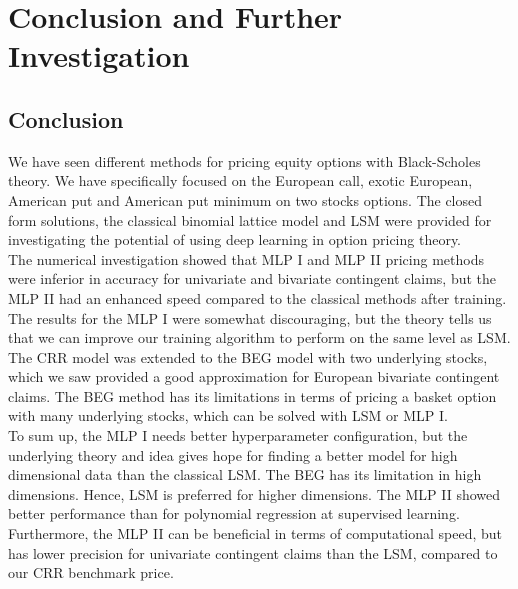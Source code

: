
\chapter{Conclusion and Further Investigation} %

\label{Chapter7} %


\section{Conclusion}
We have seen different methods for pricing equity options with Black-Scholes theory. We have specifically focused on the European call, exotic European, American put and American put minimum on two stocks options. The closed form solutions, the classical binomial lattice model and LSM were provided for investigating the potential of using deep learning in option pricing theory. \\

The numerical investigation showed that MLP I and MLP II pricing methods were inferior in accuracy for univariate and bivariate contingent claims, but the MLP II had an enhanced speed compared to the classical methods after training. The results for the MLP I were somewhat discouraging, but the theory tells us that we can improve our training algorithm to perform on the same level as LSM. The CRR model was extended to the BEG model with two underlying stocks, which we saw provided a good approximation for European bivariate contingent claims. The BEG method has its limitations in terms of pricing a basket option with many underlying stocks, which can be solved with LSM or MLP I.\\

To sum up, the MLP I needs better hyperparameter configuration, but the underlying theory and idea gives hope for finding a better model for high dimensional data than the classical LSM. The BEG has its limitation in high dimensions. Hence, LSM is preferred for higher dimensions. The MLP II showed better performance than for polynomial regression at supervised learning. Furthermore, the MLP II can be beneficial in terms of computational speed, but has lower precision for univariate contingent claims than the LSM, compared to our CRR benchmark price.\\

